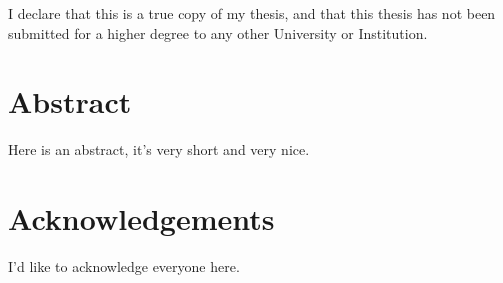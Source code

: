 \documentclass[11pt, oneside]{book} %
\begin{document}
I declare that this is a true copy of my thesis, and that this thesis has not been submitted for a higher degree to any other University or Institution.

\clearpage %

\chapter{Abstract}

Here is an abstract, it's very short and very nice.

\clearpage %

\chapter{Acknowledgements}

I'd like to acknowledge everyone here.




\clearpage %

\pagestyle{fancy} %

\setlength\cftparskip{-4pt}
\setlength\cftbeforechapskip{0pt}

\renewcommand{\contentsname}{Table of Contents} %
\tableofcontents %

\clearpage %

\listoffigures %

%
%
%
%
\mainmatter %
\end{document}
